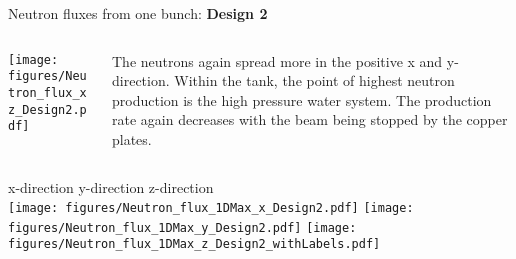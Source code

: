 \documentclass[xcolor={dvipsnames}]{beamer}
\begin{document}
\begin{frame}{Neutron fluxes from one bunch: \textbf{Design 2}}
\begin{columns}
 \begin{column}{0.5\textwidth}
    \texttt{[image: figures/Neutron\_flux\_xz\_Design2.pdf]}
 \end{column}
 \begin{column}{0.5\textwidth}
  The neutrons again spread more in the positive x and y-direction. Within the tank, the point of highest neutron production is the high pressure water system. The production rate again decreases with the beam being stopped by the copper plates.
 \end{column}
\end{columns}
\hspace*{1cm} x-direction \hfill y-direction \hfill z-direction \hspace*{1cm} \\
  \texttt{[image: figures/Neutron\_flux\_1DMax\_x\_Design2.pdf]}\hfill
  \texttt{[image: figures/Neutron\_flux\_1DMax\_y\_Design2.pdf]}\hfill
  \texttt{[image: figures/Neutron\_flux\_1DMax\_z\_Design2\_withLabels.pdf]}
\end{frame}
\end{document}
